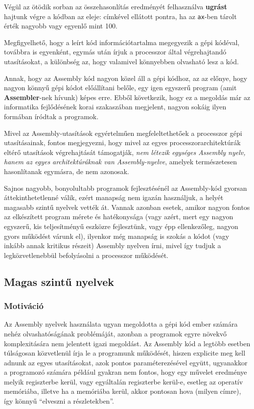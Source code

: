 Végül az ötödik sorban az összehasonlítás eredményét felhasználva \textbf{ugrást} hajtunk végre a kódban az eleje: címkével ellátott pontra, ha az \texttt{ax}-ben tárolt érték nagyobb vagy egyenlő mint 100.
 

Megfigyelhető, hogy a leírt kód információtartalma megegyezik a gépi kódéval, továbbra is egyenként, egymás után írjuk a processzor által végrehajtandó utasításokat, a különbség az, hogy valamivel könnyebben olvasható lesz a kód.

Annak, hogy az Assembly kód nagyon közel áll a gépi kódhoz, az az előnye, hogy nagyon könnyű gépi kódot előállítani belőle, egy igen egyszerű program (amit \textbf{Assembler}-nek hívunk) képes erre. Ebből következik, hogy ez a megoldás már az informatika fejlődésének korai szakaszában megjelent, nagyon sokáig ilyen formában íródtak a programok.

Mivel az Assembly-utasítások egyértelműen megfeleltethetőek a processzor gépi utasításainak, fontos megjegyezni, hogy mivel az egyes processzorarchitektúrák eltérő utasítások végrehajtását támogatják, \emph{nem létezik egységes Assembly nyelv, hanem az egyes architektúráknak van Assembly-nyelve}, amelyek természetesen hasonlítanak egymásra, de nem azonosak.

Sajnos nagyobb, bonyolultabb programok fejlesztésénél az Assembly-kód gyorsan áttekinthetetlenné válik, ezért manapság nem igazán használjuk, a helyét magasabb szintű nyelvek vették át. Vannak azonban esetek, amikor nagyon fontos az elkészített program mérete és hatékonysága (vagy azért, mert egy nagyon egyszerű, kis teljesítményű eszközre fejlesztünk, vagy épp ellenkezőleg, nagyon gyors működést várunk el), ilyenkor még manapság is szokás a kódot (vagy inkább annak kritikus részeit) Assembly nyelven írni, mivel így tudjuk a legközvetlenebbül befolyásolni a processzor működését.

 

\subsection{Magas szintű nyelvek}

\subsubsection{Motiváció}

Az Assembly nyelvek használata ugyan megoldotta a gépi kód ember számára nehéz olvashatóságának problémáját, azonban a programok egyre növekvő komplexitására nem jelentett igazi megoldást. Az Assembly kód a legtöbb esetben túlságosan közvetlenül írja le a programunk működését, hiszen explicite meg kell adnunk az egyes utasításokat, azok pontos paraméterezésével együtt, ugyanakkor a programozó számára például gyakran nem fontos, hogy egy művelet eredménye melyik regiszterbe kerül, vagy egyáltalán regiszterbe kerül-e, esetleg az operatív memóriába, illetve ha a memóriába kerül, akkor pontosan hova (milyen címre), így könnyű ``elveszni a részletekben''.


